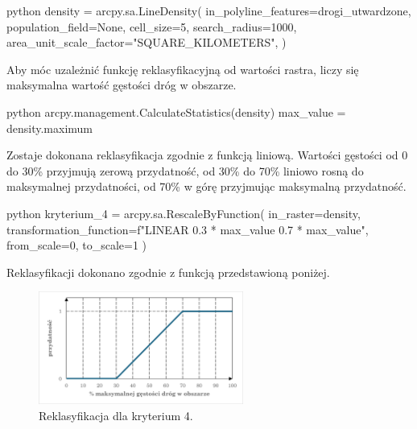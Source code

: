\documentclass{article}
\begin{document}
\begin{mintedbox}{python}
density = arcpy.sa.LineDensity(
    in_polyline_features=drogi_utwardzone,
    population_field=None,
    cell_size=5,
    search_radius=1000,
    area_unit_scale_factor="SQUARE_KILOMETERS",
)
\end{mintedbox}
\vspace{10pt}

Aby móc uzależnić funkcję reklasyfikacyjną od wartości rastra, liczy się maksymalna wartość gęstości dróg w obszarze.
\vspace{5pt}

\begin{mintedbox}{python}
arcpy.management.CalculateStatistics(density)
max_value = density.maximum
\end{mintedbox}
\vspace{10pt}

Zostaje dokonana reklasyfikacja zgodnie z funkcją liniową. Wartości gęstości od 0 do 30\% przyjmują zerową przydatność, od 30\% do 70\% liniowo rosną do maksymalnej przydatności, od 70\% w górę przyjmując maksymalną przydatność.
\vspace{5pt}

\begin{mintedbox}{python}
kryterium_4 = arcpy.sa.RescaleByFunction(
    in_raster=density,
    transformation_function=f"LINEAR {0.3 * max_value} {0.7 * max_value}",
    from_scale=0,
    to_scale=1   
)
\end{mintedbox}
\vspace{10pt}

Reklasyfikacji dokonano zgodnie z funkcją przedstawioną poniżej.
\vspace{5pt}

\begin{figure}[H]
    \centering
    \includegraphics[width=0.6\textwidth]{img/kryterium4-wykres-glowny.png}
    \caption{Reklasyfikacja dla kryterium 4.}
\end{figure}

\end{document}
